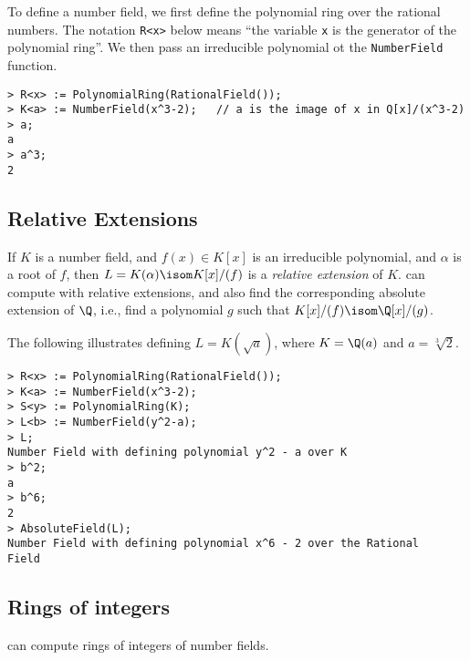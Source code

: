 To define a number field, we first define the polynomial ring
over the rational numbers.  The notation 
{\tt R<x>} below means ``the variable {\tt x} is the generator
of the polynomial ring''.  We then pass an irreducible polynomial
ot the {\tt NumberField} function.
\begin{verbatim}
> R<x> := PolynomialRing(RationalField());
> K<a> := NumberField(x^3-2);   // a is the image of x in Q[x]/(x^3-2)
> a;
a
> a^3;
2
\end{verbatim}

\subsection{Relative Extensions}
If $K$ is a number field, and $f(x)\in K[x]$ is an irreducible polynomial,
and $\alpha$ is a root of $f$, then $L=K(\alpha)\isom K[x]/(f)$ 
is a {\em relative extension} of $K$.  \magma{} can compute with
relative extensions, and also find the corresponding absolute
extension of $\Q$, i.e., find a polynomial $g$ such that
$K[x]/(f) \isom \Q[x]/(g)$.

The following illustrates defining
$L=K(\sqrt{a})$, where $K=\Q(a)$ and $a=\sqrt[3]{2}$.
\begin{verbatim}
> R<x> := PolynomialRing(RationalField());
> K<a> := NumberField(x^3-2);  
> S<y> := PolynomialRing(K);
> L<b> := NumberField(y^2-a);
> L;
Number Field with defining polynomial y^2 - a over K
> b^2;
a
> b^6;
2
> AbsoluteField(L);
Number Field with defining polynomial x^6 - 2 over the Rational 
Field
\end{verbatim}

\subsection{Rings of integers}
\magma{} can compute rings of integers of number fields.

